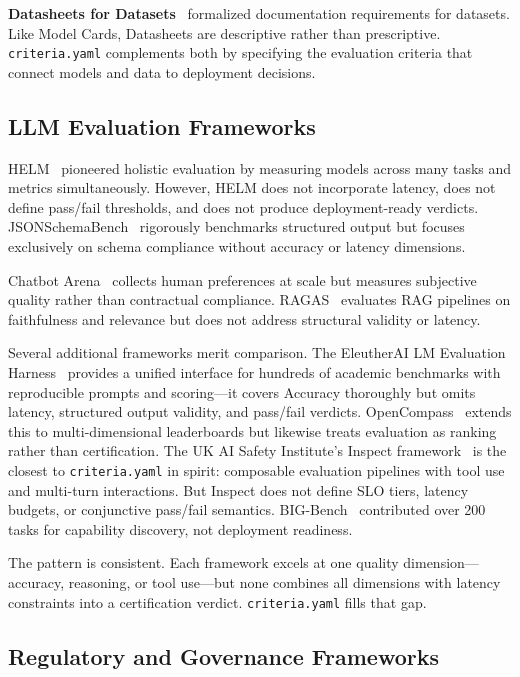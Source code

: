 \documentclass[11pt]{article}
\newcommand{\criteriayaml}{\texttt{criteria.yaml}}
\begin{document}
\textbf{Datasheets for Datasets}~\citep{gebru2021datasheets} formalized documentation requirements for datasets. Like Model Cards, Datasheets are descriptive rather than prescriptive. \criteriayaml{} complements both by specifying the evaluation criteria that connect models and data to deployment decisions.

\subsection{LLM Evaluation Frameworks}

HELM~\citep{liang2023helm} pioneered holistic evaluation by measuring models across many tasks and metrics simultaneously. However, HELM does not incorporate latency, does not define pass/fail thresholds, and does not produce deployment-ready verdicts. JSONSchemaBench~\citep{geng2025jsonschemabench} rigorously benchmarks structured output but focuses exclusively on schema compliance without accuracy or latency dimensions.

Chatbot Arena~\citep{chiang2024chatbot} collects human preferences at scale but measures subjective quality rather than contractual compliance. RAGAS~\citep{es2023ragas} evaluates RAG pipelines on faithfulness and relevance but does not address structural validity or latency.

Several additional frameworks merit comparison. The EleutherAI LM Evaluation Harness~\citep{gao2023lmeval} provides a unified interface for hundreds of academic benchmarks with reproducible prompts and scoring---it covers Accuracy thoroughly but omits latency, structured output validity, and pass/fail verdicts. OpenCompass~\citep{opencompass2023} extends this to multi-dimensional leaderboards but likewise treats evaluation as ranking rather than certification. The UK AI Safety Institute's Inspect framework~\citep{ukaisi2024inspect} is the closest to \criteriayaml{} in spirit: composable evaluation pipelines with tool use and multi-turn interactions. But Inspect does not define SLO tiers, latency budgets, or conjunctive pass/fail semantics. BIG-Bench~\citep{srivastava2023bigbench} contributed over 200 tasks for capability discovery, not deployment readiness.

The pattern is consistent. Each framework excels at one quality dimension---accuracy, reasoning, or tool use---but none combines all dimensions with latency constraints into a certification verdict. \criteriayaml{} fills that gap.

\subsection{Regulatory and Governance Frameworks}
\end{document}
